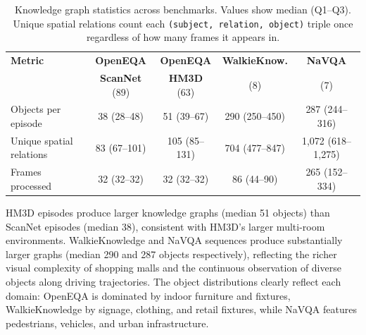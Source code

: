\begin{table}[ht]
\centering
\small
\caption{Knowledge graph statistics across benchmarks. Values show median (Q1--Q3). Unique spatial relations count each \texttt{(subject, relation, object)} triple once regardless of how many frames it appears in.}
\label{tab:kg_stats_table}
\begin{tabular}{l cccc}
\toprule
\textbf{Metric} & \textbf{OpenEQA} & \textbf{OpenEQA} & \textbf{WalkieKnow.} & \textbf{NaVQA} \\
& \textbf{ScanNet} (89) & \textbf{HM3D} (63) & (8) & (7) \\
\midrule
Objects per episode & 38 (28--48) & 51 (39--67) & 290 (250--450) & 287 (244--316) \\
Unique spatial relations & 83 (67--101) & 105 (85--131) & 704 (477--847) & 1{,}072 (618--1{,}275) \\
Frames processed & 32 (32--32) & 32 (32--32) & 86 (44--90) & 265 (152--334) \\
\bottomrule
\end{tabular}
\end{table}

HM3D episodes produce larger knowledge graphs (median 51 objects) than ScanNet episodes (median 38), consistent with HM3D's larger multi-room environments.
WalkieKnowledge and NaVQA sequences produce substantially larger graphs (median 290 and 287 objects respectively), reflecting the richer visual complexity of shopping malls and the continuous observation of diverse objects along driving trajectories.
The object distributions clearly reflect each domain: OpenEQA is dominated by indoor furniture and fixtures, WalkieKnowledge by signage, clothing, and retail fixtures, while NaVQA features pedestrians, vehicles, and urban infrastructure.



